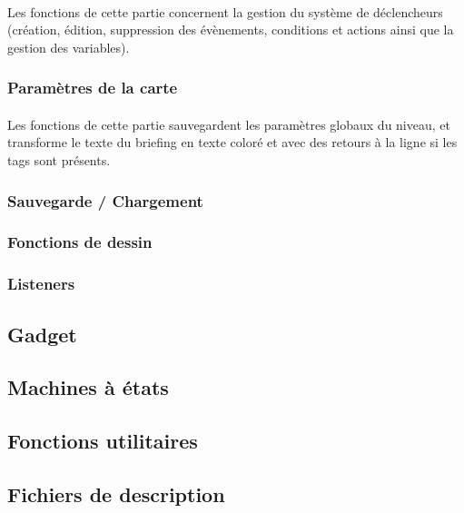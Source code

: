 \documentclass[a4paper]{article}
\begin{document}
\paragraph{}
Les fonctions de cette partie concernent la gestion du système de déclencheurs (création, édition, suppression des évènements, conditions et actions ainsi que la gestion des variables).
\subsubsection{Paramètres de la carte}
\paragraph{}
Les fonctions de cette partie sauvegardent les paramètres globaux du niveau, et transforme le texte du briefing en texte coloré et avec des retours à la ligne si les tags sont présents.
\subsubsection{Sauvegarde / Chargement}
\subsubsection{Fonctions de dessin}
\subsubsection{Listeners\label{listeners}}
\subsection{Gadget}
\subsection{Machines à états\label{statemachine}}
\subsection{Fonctions utilitaires}
\subsection{Fichiers de description}
\end{document}

